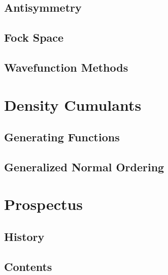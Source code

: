 \subsection{Antisymmetry}

\subsection{Fock Space}

\subsection{Wavefunction Methods}

\section{Density Cumulants}

\subsection{Generating Functions}

\subsection{Generalized Normal Ordering}

\section{Prospectus}

\subsection{History}

\subsection{Contents}



